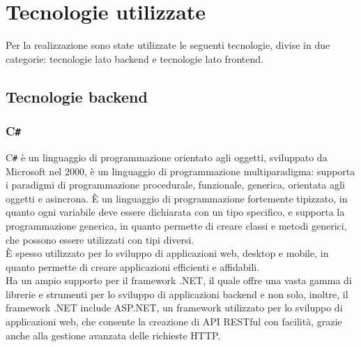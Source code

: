 \section{Tecnologie utilizzate}
Per la realizzazione sono state utilizzate le seguenti tecnologie, divise in due categorie: tecnologie lato backend e tecnologie lato frontend.\\

\subsection{Tecnologie backend}
\subsubsection{C\texttt{\#}}
C\texttt{\#} è un linguaggio di programmazione orientato agli oggetti, sviluppato da Microsoft nel 2000, è un linguaggio di programmazione multiparadigma: supporta i paradigmi di programmazione procedurale, funzionale, generica, orientata agli oggetti e asincrona.
È un linguaggio di programmazione fortemente tipizzato, in quanto ogni variabile deve essere dichiarata con un tipo specifico, e supporta la programmazione generica, in quanto permette di creare classi e metodi generici, che possono essere utilizzati con tipi diversi.\\
È spesso utilizzato per lo sviluppo di applicazioni web, desktop e mobile, in quanto permette di creare applicazioni efficienti e affidabili.\\
Ha un ampio supporto per il framework .NET, il quale offre una vasta gamma di librerie e strumenti per lo sviluppo di applicazioni backend e non solo, inoltre, il framework .NET include
ASP.NET, un framework utilizzato per lo sviluppo di applicazioni web, che consente la creazione di API RESTful con facilità, grazie anche alla gestione avanzata delle richieste HTTP.\\
